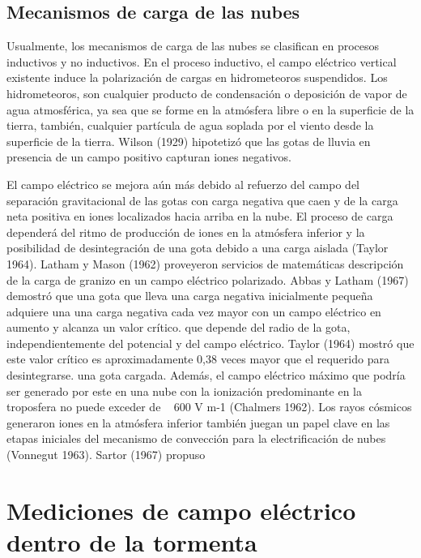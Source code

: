 \documentclass[12pt,oneside,openany,letter]{book}
\begin{document}
\subsection*{Mecanismos de carga de las nubes}

Usualmente, los mecanismos de carga de las nubes se clasifican en procesos inductivos y no inductivos. En el proceso inductivo, el campo eléctrico vertical existente induce la polarización de cargas en hidrometeoros suspendidos. Los hidrometeoros, son cualquier producto de condensación o deposición de vapor de agua atmosférica, ya sea que se forme en la atmósfera libre o en la superficie de la tierra, también, cualquier partícula de agua soplada por el viento desde la superficie de la tierra. Wilson (1929) hipotetizó que las gotas de lluvia en presencia de un campo positivo capturan iones negativos. 

El campo eléctrico se mejora aún más debido al refuerzo del campo del
separación gravitacional de las gotas con carga negativa que caen y de la carga neta positiva en iones localizados hacia arriba en la nube. El proceso de carga dependerá del ritmo de producción de iones en la atmósfera inferior y la posibilidad de desintegración de una gota debido a una carga aislada (Taylor 1964). Latham y Mason (1962) proveyeron servicios de matemáticas descripción de la carga de granizo en un campo eléctrico polarizado. Abbas y Latham (1967) demostró que una gota que lleva una carga negativa inicialmente pequeña adquiere una una carga negativa cada vez mayor con un campo eléctrico en aumento y alcanza un valor crítico. que depende del radio de la gota, independientemente del potencial y del campo eléctrico. Taylor (1964) mostró que este valor crítico es aproximadamente 0,38 veces mayor que el requerido para desintegrarse. una gota cargada. Además, el campo eléctrico máximo que podría ser generado por este en una nube con la ionización predominante en la troposfera no puede exceder de ~ 600 V m-1 (Chalmers 1962). Los rayos cósmicos generaron iones en la atmósfera inferior también juegan un papel clave en las etapas iniciales del mecanismo de convección para la electrificación de nubes (Vonnegut 1963). Sartor (1967) propuso 


\section*{Mediciones de campo eléctrico dentro de la tormenta}
\end{document}
